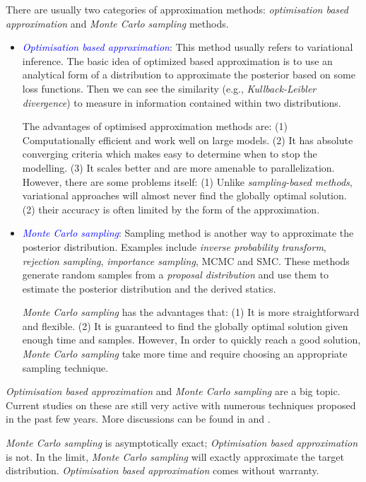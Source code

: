 There are usually two categories of approximation methods: \textit{optimisation based approximation} and \textit{Monte Carlo sampling} methods.
\begin{itemize}[left=0pt]
    \item \textcolor{blue}{\textit{Optimisation based approximation}}: This method usually refers to variational inference. The basic idea of optimized based approximation is to use an analytical form of a distribution to approximate the posterior based on some loss functions. Then we can see the similarity (e.g., \textit{Kullback-Leibler divergence}) to measure in information contained within two distributions.
    
    The advantages of optimised approximation methods are: (1) Computationally efficient and work well on large models. (2) It has absolute converging criteria which makes easy to determine when to stop the modelling. (3) It scales better and are more amenable to parallelization. However, there are some problems itself: (1) Unlike \textit{sampling-based methods}, variational approaches will almost never find the globally optimal solution. (2) their accuracy is often limited by the form of the approximation.
    \item \textcolor{blue}{\textit{Monte Carlo sampling}}: Sampling method is another way to approximate the posterior distribution. Examples include \textit{inverse probability transform}, \textit{rejection sampling}, \textit{importance sampling}, \acrfull{MCMC} and \acrfull{SMC}. These methods generate random samples from a \textit{proposal distribution} and use them to estimate the posterior distribution and the derived statics.

    \textit{Monte Carlo sampling} has the advantages that: (1) It is more straightforward and flexible. (2) It is guaranteed to find the globally optimal solution given enough time and samples. However, In order to quickly reach a good solution, \textit{Monte Carlo sampling} take more time and require choosing an appropriate sampling technique. 
\end{itemize}

\textit{Optimisation based approximation} and \textit{Monte Carlo sampling} are a big topic. Current studies on these are still very active with numerous techniques proposed in the past few years. More discussions can be found in \cite{murphy2012} and \cite{blei2017}. 

\textit{Monte Carlo sampling} is asymptotically exact; \textit{Optimisation based approximation} is not. In the limit, \textit{Monte Carlo sampling} will exactly approximate the target distribution. \textit{Optimisation based approximation} comes without warranty.

